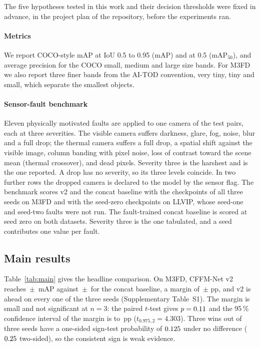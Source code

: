 The five hypotheses tested in this work and their decision thresholds were fixed in advance, in the project plan of the repository, before the experiments ran.

\paragraph{Metrics}
We report COCO-style mAP at IoU 0.5 to 0.95 (mAP) and at 0.5 (mAP$_{50}$), and average precision for the COCO small, medium and large size bands. For M3FD we also report three finer bands from the AI-TOD convention, very tiny, tiny and small, which separate the smallest objects.

\paragraph{Sensor-fault benchmark}
Eleven physically motivated faults are applied to one camera of the test pairs, each at three severities. The visible camera suffers darkness, glare, fog, noise, blur and a full drop; the thermal camera suffers a full drop, a spatial shift against the visible image, column banding with pixel noise, loss of contrast toward the scene mean (thermal crossover), and dead pixels. Severity three is the harshest and is the one reported. A drop has no severity, so its three levels coincide. In two further rows the dropped camera is declared to the model by the sensor flag. The benchmark scores v2 and the concat baseline with the checkpoints of all three seeds on M3FD and with the seed-zero checkpoints on LLVIP, whose seed-one and seed-two faults were not run. The fault-trained concat baseline is scored at seed zero on both datasets. Severity three is the one tabulated, and a seed contributes one value per fault.

\subsection{Main results}
\label{sec:main}
Table~\ref{tab:main} gives the headline comparison. On M3FD, CFFM-Net v2 reaches \resMfdCffmVtwoMeanMap{}\,$\pm$\,\resMfdCffmVtwoStdMap{} mAP against \resMfdConcatMdMeanMap{}\,$\pm$\,\resMfdConcatMdStdMap{} for the concat baseline, a margin of \marMfdVtwoVsConcatMdMeanMap{}\,$\pm$\,\marMfdVtwoVsConcatMdStdMap{}\,pp, and v2 is ahead on every one of the three seeds (Supplementary Table~S1). The margin is small and not significant at $n=3$: the paired $t$-test gives $p=0.11{}$ and the 95\,\% confidence interval of the margin is \sigMfdCiLow{} to \sigMfdCiHigh{}\,pp ($t_{0.975,2}=4.303$). Three wins out of three seeds have a one-sided sign-test probability of $0.125{}$ under no difference ($0.25{}$ two-sided), so the consistent sign is weak evidence.

